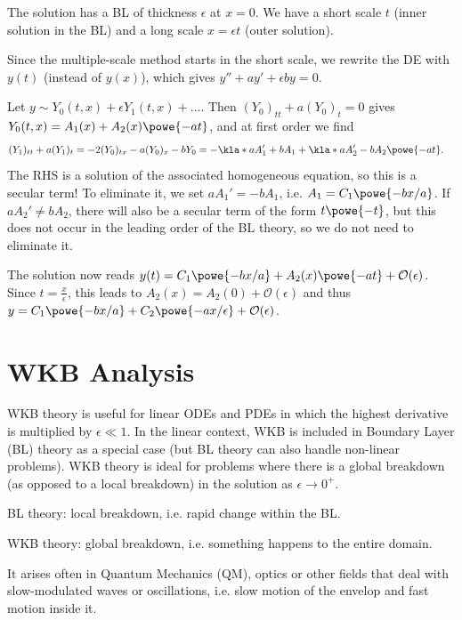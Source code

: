 \documentclass[english, parskip=full]{scrbook}
\newcommand{\note}[1]{\begin{tcolorbox}[colback=colorbackgroundnote,colframe=colornote, breakable,enhanced]#1\end{tcolorbox}}
\newcommand{\example}[3]{\begin{tcolorbox}[colback=colorbackgroundexample,colframe=colorexample, breakable,enhanced,title={\textbf{#1}: #2.}]#3\end{tcolorbox}}
\begin{document}
\example{Boundary-Layer problem}{$\epsilon y'' + ay' + by=0$ with $a>0$, $y(0)=A$ and $y(1)=B$}{
The solution has a BL of thickness $\epsilon$ at $x=0$.
We have a short scale $t$ (inner solution in the BL) and a long scale $x=\epsilon t$ (outer solution).

Since the multiple-scale method starts in the short scale, we rewrite the DE with $y(t)$ (instead of $y(x)$), which gives $y'' + ay' + \epsilon by=0$.

Let $y\sim Y_0(t,x) + \epsilon Y_1(t,x) + \dots$.
Then $(Y_0)_{tt} + a(Y_0)_t = 0$ gives $Y_0(t,x)=A_1(x)+A_2(x)\powe{-at}$, and at first order we find
\begin{align}
(Y_1)_{tt} + a(Y_1)_t &= -2 (Y_0)_{tx} - a(Y_0)_x - bY_0 = -\kla*{aA_1' + bA_1} + \kla*{aA_2' - bA_2} \powe{-at}.
\end{align}
The RHS is a solution of the associated homogeneous equation, so this is a secular term!
To eliminate it, we set $aA_1'=-bA_1$, i.e. $A_1=C_1\powe{-bx/a}$.
If $aA_2'\neq bA_2$, there will also be a secular term of the form $t\powe{-t}$, but this does not occur in the leading order of the BL theory, so we do not need to eliminate it.

The solution now reads $y(t)=C_1\powe{-bx/a} + A_2(x) \powe{-at} + \mathcal{O}(\epsilon)$.
Since $t=\frac{x}{\epsilon}$, this leads to $A_2(x)=A_2(0)+\mathcal{O}(\epsilon)$ and thus $y=C_1\powe{-bx/a} + C_2\powe{-ax/\epsilon}+\mathcal{O}(\epsilon)$.
}

\chapter{WKB Analysis}
WKB theory is useful for linear ODEs and PDEs in which the highest derivative is multiplied by $\epsilon \ll 1$.
In the linear context, WKB is included in Boundary Layer (BL) theory as a special case (but BL theory can also handle non-linear problems).
WKB theory is ideal for problems where there is a global breakdown (as opposed to a local breakdown) in the solution as $\epsilon\rightarrow 0^+$.
\note{BL theory: local breakdown, i.e. rapid change within the BL.

WKB theory: global breakdown, i.e. something happens to the entire domain.}
It arises often in Quantum Mechanics (QM), optics or other fields that deal with slow-modulated waves or oscillations, i.e. slow motion of the envelop and fast motion inside it.
\end{document}
